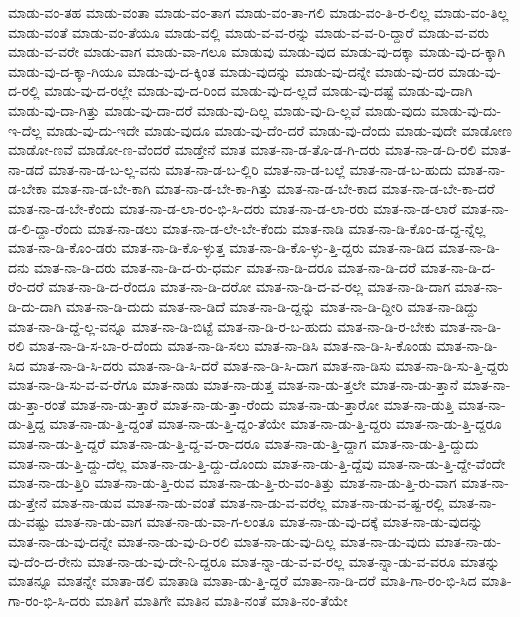 {ಮಾಡು-ವಂ-ತಹ
ಮಾಡು-ವಂತಾ
ಮಾಡು-ವಂ-ತಾಗ
ಮಾಡು-ವಂ-ತಾ-ಗಲಿ
ಮಾಡು-ವಂ-ತಿ-ರ-ಲಿಲ್ಲ
ಮಾಡು-ವಂ-ತಿಲ್ಲ
ಮಾಡು-ವಂತೆ
ಮಾಡು-ವಂ-ತೆಯೂ
ಮಾಡು-ವಲ್ಲಿ
ಮಾಡು-ವ-ವ-ರನ್ನು
ಮಾಡು-ವ-ವ-ರಿ-ದ್ದಾರೆ
ಮಾಡು-ವ-ವರು
ಮಾಡು-ವ-ವರೇ
ಮಾಡು-ವಾಗ
ಮಾಡು-ವಾ-ಗಲೂ
ಮಾಡುವು
ಮಾಡು-ವುದ
ಮಾಡು-ವು-ದಕ್ಕಾ
ಮಾಡು-ವು-ದ-ಕ್ಕಾಗಿ
ಮಾಡು-ವು-ದ-ಕ್ಕಾ-ಗಿಯೂ
ಮಾಡು-ವು-ದ-ಕ್ಕಿಂತ
ಮಾಡು-ವುದನ್ನು
ಮಾಡು-ವು-ದನ್ನೇ
ಮಾಡು-ವು-ದರ
ಮಾಡು-ವು-ದ-ರಲ್ಲಿ
ಮಾಡು-ವು-ದ-ರಲ್ಲೇ
ಮಾಡು-ವು-ದ-ರಿಂದ
ಮಾಡು-ವು-ದ-ಲ್ಲದೆ
ಮಾಡು-ವು-ದಷ್ಟೆ
ಮಾಡು-ವು-ದಾಗಿ
ಮಾಡು-ವು-ದಾ-ಗಿತ್ತು
ಮಾಡು-ವು-ದಾ-ದರೆ
ಮಾಡು-ವು-ದಿಲ್ಲ
ಮಾಡು-ವು-ದಿ-ಲ್ಲವೆ
ಮಾಡು-ವುದು
ಮಾಡು-ವು-ದು-ಇ-ದೆಲ್ಲ
ಮಾಡು-ವು-ದು-ಇದೇ
ಮಾಡು-ವುದೂ
ಮಾಡು-ವು-ದೆಂ-ದರೆ
ಮಾಡು-ವು-ದೆಂದು
ಮಾಡು-ವುದೇ
ಮಾಡೋಣ
ಮಾಡೋ-ಣವೆ
ಮಾಡೋ-ಣ-ವೆಂದರೆ
ಮಾಡ್ತೇನೆ
ಮಾತ
ಮಾತ-ನಾ-ಡ-ತೊ-ಡ-ಗಿ-ದರು
ಮಾತ-ನಾ-ಡ-ದಿ-ರಲಿ
ಮಾತ-ನಾ-ಡದೆ
ಮಾತ-ನಾ-ಡ-ಬ-ಲ್ಲ-ವನು
ಮಾತ-ನಾ-ಡ-ಬ-ಲ್ಲಿರಿ
ಮಾತ-ನಾ-ಡ-ಬಲ್ಲೆ
ಮಾತ-ನಾ-ಡ-ಬ-ಹುದು
ಮಾತ-ನಾ-ಡ-ಬೇಕಾ
ಮಾತ-ನಾ-ಡ-ಬೇ-ಕಾಗಿ
ಮಾತ-ನಾ-ಡ-ಬೇ-ಕಾ-ಗಿತ್ತು
ಮಾತ-ನಾ-ಡ-ಬೇ-ಕಾದ
ಮಾತ-ನಾ-ಡ-ಬೇ-ಕಾ-ದರೆ
ಮಾತ-ನಾ-ಡ-ಬೇ-ಕೆಂದು
ಮಾತ-ನಾ-ಡ-ಲಾ-ರಂ-ಭಿ-ಸಿ-ದರು
ಮಾತ-ನಾ-ಡ-ಲಾ-ರರು
ಮಾತ-ನಾ-ಡ-ಲಾರೆ
ಮಾತ-ನಾ-ಡ-ಲಿ-ದ್ದಾ-ರೆಂದು
ಮಾತ-ನಾ-ಡಲು
ಮಾತ-ನಾ-ಡ-ಲೇ-ಬೇ-ಕೆಂದು
ಮಾತ-ನಾಡಿ
ಮಾತ-ನಾ-ಡಿ-ಕೊಂ-ಡ-ದ್ದ-ನ್ನೆಲ್ಲ
ಮಾತ-ನಾ-ಡಿ-ಕೊಂ-ಡರು
ಮಾತ-ನಾ-ಡಿ-ಕೊ-ಳ್ಳುತ್ತ
ಮಾತ-ನಾ-ಡಿ-ಕೊ-ಳ್ಳು-ತ್ತಿ-ದ್ದರು
ಮಾತ-ನಾ-ಡಿದ
ಮಾತ-ನಾ-ಡಿ-ದನು
ಮಾತ-ನಾ-ಡಿ-ದರು
ಮಾತ-ನಾ-ಡಿ-ದ-ರು-ಧರ್ಮ
ಮಾತ-ನಾ-ಡಿ-ದರೂ
ಮಾತ-ನಾ-ಡಿ-ದರೆ
ಮಾತ-ನಾ-ಡಿ-ದ-ರೆಂ-ದರೆ
ಮಾತ-ನಾ-ಡಿ-ದ-ರೆಂದೂ
ಮಾತ-ನಾ-ಡಿ-ದರೋ
ಮಾತ-ನಾ-ಡಿ-ದ-ವ-ರಲ್ಲ
ಮಾತ-ನಾ-ಡಿ-ದಾಗ
ಮಾತ-ನಾ-ಡಿ-ದು-ದಾಗಿ
ಮಾತ-ನಾ-ಡಿ-ದುದು
ಮಾತ-ನಾ-ಡಿದೆ
ಮಾತ-ನಾ-ಡಿ-ದ್ದನ್ನು
ಮಾತ-ನಾ-ಡಿ-ದ್ದೀರಿ
ಮಾತ-ನಾ-ಡಿದ್ದು
ಮಾತ-ನಾ-ಡಿ-ದ್ದೆ-ಲ್ಲ-ವನ್ನೂ
ಮಾತ-ನಾ-ಡಿ-ಬಿಟ್ಟೆ
ಮಾತ-ನಾ-ಡಿ-ರ-ಬ-ಹುದು
ಮಾತ-ನಾ-ಡಿ-ರ-ಬೇಕು
ಮಾತ-ನಾ-ಡಿ-ರಲಿ
ಮಾತ-ನಾ-ಡಿ-ಸ-ಬಾ-ರ-ದೆಂದು
ಮಾತ-ನಾ-ಡಿ-ಸಲು
ಮಾತ-ನಾ-ಡಿಸಿ
ಮಾತ-ನಾ-ಡಿ-ಸಿ-ಕೊಂಡು
ಮಾತ-ನಾ-ಡಿ-ಸಿದ
ಮಾತ-ನಾ-ಡಿ-ಸಿ-ದರು
ಮಾತ-ನಾ-ಡಿ-ಸಿ-ದರೆ
ಮಾತ-ನಾ-ಡಿ-ಸಿ-ದಾಗ
ಮಾತ-ನಾ-ಡಿಸು
ಮಾತ-ನಾ-ಡಿ-ಸು-ತ್ತಿ-ದ್ದರು
ಮಾತ-ನಾ-ಡಿ-ಸು-ವ-ವ-ರೆಗೂ
ಮಾತ-ನಾಡು
ಮಾತ-ನಾ-ಡುತ್ತ
ಮಾತ-ನಾ-ಡು-ತ್ತಲೇ
ಮಾತ-ನಾ-ಡು-ತ್ತಾನೆ
ಮಾತ-ನಾ-ಡು-ತ್ತಾ-ರಂತೆ
ಮಾತ-ನಾ-ಡು-ತ್ತಾರೆ
ಮಾತ-ನಾ-ಡು-ತ್ತಾ-ರೆಂದು
ಮಾತ-ನಾ-ಡು-ತ್ತಾರೋ
ಮಾತ-ನಾ-ಡುತ್ತಿ
ಮಾತ-ನಾ-ಡು-ತ್ತಿದ್ದ
ಮಾತ-ನಾ-ಡು-ತ್ತಿ-ದ್ದಂತೆ
ಮಾತ-ನಾ-ಡು-ತ್ತಿ-ದ್ದಂ-ತೆಯೇ
ಮಾತ-ನಾ-ಡು-ತ್ತಿ-ದ್ದರು
ಮಾತ-ನಾ-ಡು-ತ್ತಿ-ದ್ದರೂ
ಮಾತ-ನಾ-ಡು-ತ್ತಿ-ದ್ದರೆ
ಮಾತ-ನಾ-ಡು-ತ್ತಿ-ದ್ದ-ವ-ರಾ-ದರೂ
ಮಾತ-ನಾ-ಡು-ತ್ತಿ-ದ್ದಾಗ
ಮಾತ-ನಾ-ಡು-ತ್ತಿ-ದ್ದುದು
ಮಾತ-ನಾ-ಡು-ತ್ತಿ-ದ್ದು-ದೆಲ್ಲ
ಮಾತ-ನಾ-ಡು-ತ್ತಿ-ದ್ದು-ದೊಂದು
ಮಾತ-ನಾ-ಡು-ತ್ತಿ-ದ್ದೆವು
ಮಾತ-ನಾ-ಡು-ತ್ತಿ-ದ್ದೇ-ವೆಂದೇ
ಮಾತ-ನಾ-ಡು-ತ್ತಿರಿ
ಮಾತ-ನಾ-ಡು-ತ್ತಿ-ರುವ
ಮಾತ-ನಾ-ಡು-ತ್ತಿ-ರು-ವಂ-ತಿತ್ತು
ಮಾತ-ನಾ-ಡು-ತ್ತಿ-ರು-ವಾಗ
ಮಾತ-ನಾ-ಡು-ತ್ತೇನೆ
ಮಾತ-ನಾ-ಡುವ
ಮಾತ-ನಾ-ಡು-ವಂತೆ
ಮಾತ-ನಾ-ಡು-ವ-ವರೆಲ್ಲ
ಮಾತ-ನಾ-ಡು-ವ-ಷ್ಟ-ರಲ್ಲಿ
ಮಾತ-ನಾ-ಡು-ವಷ್ಟು
ಮಾತ-ನಾ-ಡು-ವಾಗ
ಮಾತ-ನಾ-ಡು-ವಾ-ಗ-ಲಂತೂ
ಮಾತ-ನಾ-ಡು-ವು-ದಕ್ಕೆ
ಮಾತ-ನಾ-ಡು-ವುದನ್ನು
ಮಾತ-ನಾ-ಡು-ವು-ದನ್ನೇ
ಮಾತ-ನಾ-ಡು-ವು-ದಿ-ರಲಿ
ಮಾತ-ನಾ-ಡು-ವು-ದಿಲ್ಲ
ಮಾತ-ನಾ-ಡು-ವುದು
ಮಾತ-ನಾ-ಡು-ವು-ದೆಂ-ದ-ರೇನು
ಮಾತ-ನಾ-ಡು-ವು-ದೇ-ನಿ-ದ್ದರೂ
ಮಾತ-ನ್ನಾ-ಡು-ವ-ವ-ರಲ್ಲ
ಮಾತ-ನ್ನಾ-ಡು-ವ-ವರೂ
ಮಾತನ್ನು
ಮಾತನ್ನೂ
ಮಾತನ್ನೇ
ಮಾತಾ-ಡಲಿ
ಮಾತಾಡಿ
ಮಾತಾ-ಡು-ತ್ತಿ-ದ್ದರೆ
ಮಾತಾ-ನಾ-ಡಿ-ದರೆ
ಮಾತಿ-ಗಾ-ರಂ-ಭಿ-ಸಿದ
ಮಾತಿ-ಗಾ-ರಂ-ಭಿ-ಸಿ-ದರು
ಮಾತಿಗೆ
ಮಾತಿಗೇ
ಮಾತಿನ
ಮಾತಿ-ನಂತೆ
ಮಾತಿ-ನಂ-ತೆಯೇ
}
